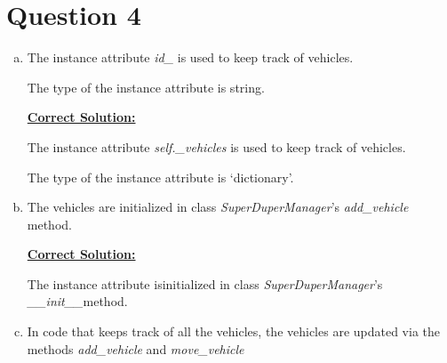 \documentclass[12pt]{article}
\begin{document}
\section*{Question 4}
\begin{enumerate}[a.]
    \item The instance attribute \textit{id\_} is used to keep track of vehicles.

    \bigskip

    The type of the instance attribute is string.

    \begin{mdframed}
        \underline{\textbf{Correct Solution:}}

        \bigskip

        The instance attribute \color{red}\textit{self.\_vehicles}\color{black}\:
        is used to keep track of vehicles.

        \bigskip

        The type of the instance attribute is \color{red}`dictionary'\color{black}.

    \end{mdframed}

    \bigskip

    \item The vehicles are initialized in class \textit{SuperDuperManager}'s
    \textit{add\_vehicle} method.

    \begin{mdframed}
        \underline{\textbf{Correct Solution:}}

        \bigskip

        The \color{red}instance attribute is\color{black}\:initialized in class
        \textit{SuperDuperManager}'s \color{red}\textit{\_\_init\_\_}\color{black}\:method.

    \end{mdframed}


    \item In code that keeps track of all the vehicles, the vehicles are updated
    via the methods \textit{add\_vehicle} and \textit{move\_vehicle}
\end{enumerate}
\end{document}
